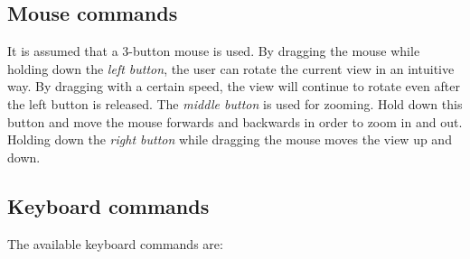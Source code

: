 \subsection{Mouse commands}
It is assumed that a 3-button mouse is used.  By dragging the mouse while holding down the
\emph{left button}, the user can rotate the current view in an intuitive way.  By dragging
with a certain speed, the view will continue to rotate even after the left button is released.
The \emph{middle button} is used for zooming.  Hold down this button and move the mouse 
forwards and backwards in order to zoom in and out.  Holding down the \emph{right button}
while dragging the mouse moves the view up and down.

\subsection{Keyboard commands}

The available keyboard commands are:

